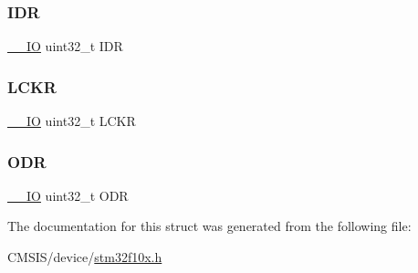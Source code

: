 \mbox{\label{struct_g_p_i_o___type_def_a328d2fe9ef1d513c3a97d30f98f0047c}} 
\subsubsection{\texorpdfstring{IDR}{IDR}}
{\footnotesize\ttfamily \mbox{\hyperlink{core__sc300_8h_aec43007d9998a0a0e01faede4133d6be}{\+\_\+\+\_\+\+IO}} uint32\+\_\+t I\+DR}

\mbox{\label{struct_g_p_i_o___type_def_a2612a0f4b3fbdbb6293f6dc70105e190}} 
\subsubsection{\texorpdfstring{LCKR}{LCKR}}
{\footnotesize\ttfamily \mbox{\hyperlink{core__sc300_8h_aec43007d9998a0a0e01faede4133d6be}{\+\_\+\+\_\+\+IO}} uint32\+\_\+t L\+C\+KR}

\mbox{\label{struct_g_p_i_o___type_def_abff7fffd2b5a718715a130006590c75c}} 
\subsubsection{\texorpdfstring{ODR}{ODR}}
{\footnotesize\ttfamily \mbox{\hyperlink{core__sc300_8h_aec43007d9998a0a0e01faede4133d6be}{\+\_\+\+\_\+\+IO}} uint32\+\_\+t O\+DR}



The documentation for this struct was generated from the following file\+:\begin{DoxyCompactItemize}
\item 
C\+M\+S\+I\+S/device/\mbox{\hyperlink{stm32f10x_8h}{stm32f10x.\+h}}\end{DoxyCompactItemize}
